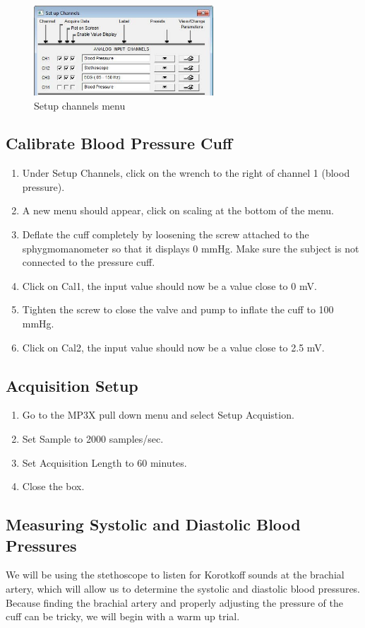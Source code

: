 \documentclass{article}
\begin{document}
\begin{figure}[h]
\centering\includegraphics[width=0.6\textwidth]{../images/BP_5.jpg}
\caption{Setup channels menu}
\label{setup}
\end{figure}

\subsection*{Calibrate Blood Pressure Cuff}
\begin{enumerate}
	\item Under Setup Channels, click on the wrench to the right of channel 1 (blood pressure).
	\item A new menu should appear, click on scaling at the bottom of the menu.
	\item Deflate the cuff completely by loosening the screw attached to the sphygmomanometer so that it displays 0 mmHg. Make sure the subject is not connected to the pressure cuff.
	\item Click on Cal1, the input value should now be a value close to 0 mV.
	\item Tighten the screw to close the valve and pump to inflate the cuff to 100 mmHg.
	\item Click on Cal2, the input value should now be a value close to 2.5 mV.
\end{enumerate}

\subsection*{Acquisition Setup}
\begin{enumerate}
	\item Go to the MP3X pull down menu and select Setup Acquistion.
		\item Set Sample to 2000 samples/sec.
		\item Set Acquisition Length to 60 minutes.
		\item Close the box.
\end{enumerate}

\subsection*{Measuring Systolic and Diastolic Blood Pressures}
We will be using the stethoscope to listen for Korotkoff sounds at the brachial artery, which will allow us to determine the systolic and diastolic blood pressures. Because finding the brachial artery and properly adjusting the pressure of the cuff can be tricky, we will begin with a warm up trial.
\end{document}

